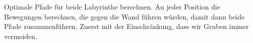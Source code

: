 \documentclass[11pt]{article}
\begin{document}
   Optimale Pfade für beide Labyrinthe berechnen.
    An jeder Position die Bewegungen berechnen, die gegen die Wand führen würden,
    damit dann beide Pfade zusammenführen.
    Zuerst mit der Einschränkung, dass wir Gruben immer vermeiden.
\end{document}
